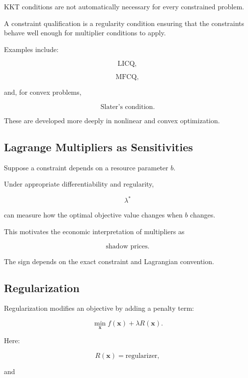 KKT conditions are not automatically necessary for every constrained
problem.

A constraint qualification is a regularity condition ensuring that the
constraints behave well enough for multiplier conditions to apply.

Examples include:

\[
\boxed{
\text{LICQ},
}
\]

\[
\boxed{
\text{MFCQ},
}
\]

and, for convex problems,

\[
\boxed{
\text{Slater's condition}.
}
\]

These are developed more deeply in nonlinear and convex optimization.

\subsection{Lagrange Multipliers as Sensitivities}
\label{subsec:lagrange-multiplier-sensitivity}

Suppose a constraint depends on a resource parameter \(b\).

Under appropriate differentiability and regularity,

\[
\boxed{
\lambda^*
}
\]

can measure how the optimal objective value changes when \(b\) changes.

This motivates the economic interpretation of multipliers as

\[
\boxed{
\text{shadow prices}.
}
\]

The sign depends on the exact constraint and Lagrangian convention.

\subsection{Regularization}
\label{subsec:optimization-regularization}

Regularization modifies an objective by adding a penalty term:

\[
\boxed{
\min_{\mathbf{x}}
f(\mathbf{x})
+
\lambda R(\mathbf{x}).
}
\]

Here:

\[
R(\mathbf{x})
=
\text{regularizer},
\]

and

